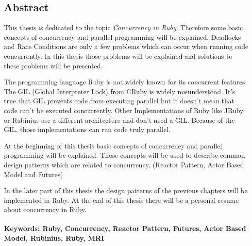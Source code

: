 \subsection*{Abstract}

This thesis is dedicated to the topic \emph{Concurrency in Ruby}. Therefore some basic concepts of concurrency and parallel programming will be explained. Deadlocks and Race Conditions are only a few problems which can occur when running code concurrently. In this thesis those problems will be explained and solutions to these problems will be presented. 

The programming language Ruby is not widely known for its concurrent features. The GIL (Global Interpreter Lock) from CRuby is widely misunderstood. It's true that GIL prevents code from executing parallel but it doesn't mean that code can't be executed concurrently. Other Implementations of Ruby like JRuby or Rubinius use a different architecture and don't need a GIL. Because of the GIL, those implementations can run code truly parallel.

At the beginning of this thesis basic concepts of concurrency and parallel programming will be explained. Those concepts will be used to describe common design patterns which are related to concurrency. (Reactor Pattern, Actor Based Model and Futures)

In the later part of this thesis the design patterns of the previous chapters will be implemented in Ruby. At the end of this thesis there will be a personal resume about concurrency in Ruby.

\paragraph{Keywords:  Ruby, Concurrency, Reactor Pattern, Futures, Actor Based Model, Rubinius, Ruby, MRI}

